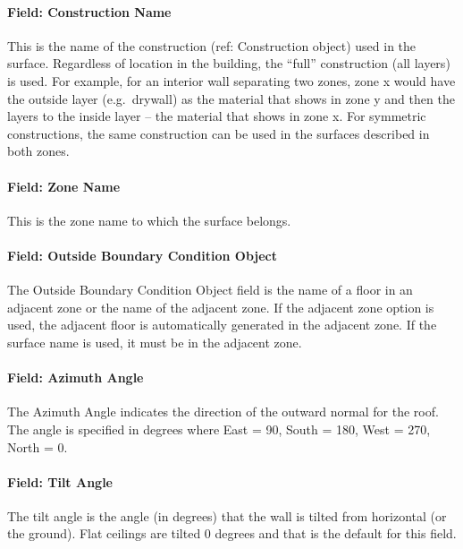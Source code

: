 \paragraph{Field: Construction Name}\label{field-construction-name-6}

This is the name of the construction (ref: Construction object) used in the surface. Regardless of location in the building, the ``full'' construction (all layers) is used. For example, for an interior wall separating two zones, zone x would have the outside layer (e.g.~drywall) as the material that shows in zone y and then the layers to the inside layer -- the material that shows in zone x. For symmetric constructions, the same construction can be used in the surfaces described in both zones.

\paragraph{Field: Zone Name}\label{field-zone-name-6-004}

This is the zone name to which the surface belongs.

\paragraph{Field: Outside Boundary Condition Object}\label{field-outside-boundary-condition-object-1}

The Outside Boundary Condition Object field is the name of a floor in an adjacent zone or the name of the adjacent zone. If the adjacent zone option is used, the adjacent floor is automatically generated in the adjacent zone. If the surface name is used, it must be in the adjacent zone.

\paragraph{Field: Azimuth Angle}\label{field-azimuth-angle-6}

The Azimuth Angle indicates the direction of the outward normal for the roof. The angle is specified in degrees where East = 90, South = 180, West = 270, North = 0.

\paragraph{Field: Tilt Angle}\label{field-tilt-angle-6}

The tilt angle is the angle (in degrees) that the wall is tilted from horizontal (or the ground). Flat ceilings are tilted 0 degrees and that is the default for this field.

